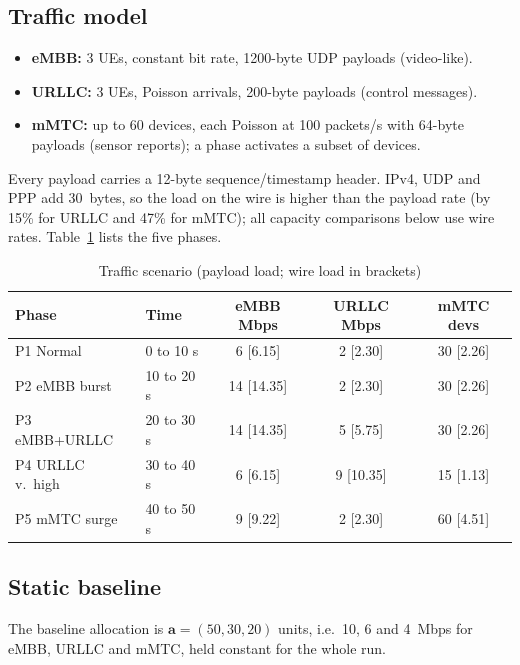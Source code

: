\documentclass[conference]{IEEEtran}
\begin{document}
\subsection{Traffic model}
\begin{itemize}
\item \textbf{eMBB:} 3 UEs, constant bit rate, 1200-byte UDP payloads (video-like).
\item \textbf{URLLC:} 3 UEs, Poisson arrivals, 200-byte payloads (control messages).
\item \textbf{mMTC:} up to 60 devices, each Poisson at 100 packets/s with 64-byte payloads (sensor reports); a phase activates a subset of devices.
\end{itemize}
Every payload carries a 12-byte sequence/timestamp header. IPv4, UDP and PPP add 30~bytes, so the load on the wire is higher than the payload rate (by 15\% for URLLC and 47\% for mMTC); all capacity comparisons below use wire rates. Table~\ref{tab:phases} lists the five phases.

\begin{table}[t]
\centering
\caption{Traffic scenario (payload load; wire load in brackets)}
\label{tab:phases}
\footnotesize
\setlength{\tabcolsep}{2.5pt}
\begin{tabular}{@{}llccc@{}}
\toprule
Phase & Time & eMBB Mbps & URLLC Mbps & mMTC devs \\
\midrule
P1 Normal & 0 to 10 s & 6 [6.15] & 2 [2.30] & 30 [2.26] \\
P2 eMBB burst & 10 to 20 s & 14 [14.35] & 2 [2.30] & 30 [2.26] \\
P3 eMBB+URLLC & 20 to 30 s & 14 [14.35] & 5 [5.75] & 30 [2.26] \\
P4 URLLC v.\ high & 30 to 40 s & 6 [6.15] & 9 [10.35] & 15 [1.13] \\
P5 mMTC surge & 40 to 50 s & 9 [9.22] & 2 [2.30] & 60 [4.51] \\
\bottomrule
\end{tabular}
\end{table}

\subsection{Static baseline}
The baseline allocation is $\mathbf{a}=(50,30,20)$ units, i.e.\ 10, 6 and 4~Mbps for eMBB, URLLC and mMTC, held constant for the whole run.
\end{document}
